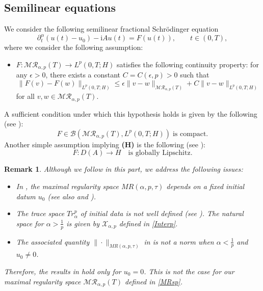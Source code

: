 \documentclass[reqno]{amsart}
\newtheorem{rmk}{Remark}
\numberwithin{equation}{section}
\begin{document}
\subsection{Semilinear equations}
We consider the following semilinear fractional Schr\"odinger equation
\begin{equation}\label{semieq0}
\partial_t^\alpha (u(t)-u_0) -\mathrm{i} Au(t)=F(u(t)), \qquad t \in (0,T),
\end{equation}
where we consider the following assumption:
\begin{itemize}
     \item[\textbf{(H)}] $F: \mathcal{M}\mathcal{R}_{\alpha,p}(T) \to L^p(0,T;H)$ satisfies the following continuity property: for any $\epsilon>0$, there
exists a constant $C=C(\epsilon,p)>0$ such that
     \begin{equation}
        \|F(v)-F(w)\|_{L^p(0,T;H)}\le \epsilon\|v-w\|_{\mathcal{M}\mathcal{R}_{\alpha,p}(T)}+C\|v-w\|_{L^p(0,T;H)}
    \end{equation}
    for all $v,w\in \mathcal{M}\mathcal{R}_{\alpha,p}(T).$
\end{itemize}
A sufficient condition under which this hypothesis holds is given by the following (see \cite[Lemme 8.2]{Are15}):
    \begin{equation}
        F\in \mathcal{B}(\mathcal{M}\mathcal{R}_{\alpha,p}(T), L^p(0,T;H))\; \mbox{is compact}.
    \end{equation}
    Another simple assumption implying \textbf{(H)} is the following (see \cite[Example 4.1]{Ach22}):
   $$F : D(A) \to H \quad \text{is globally Lipschitz}.$$
\begin{rmk}
Although we follow \cite{Ach22} in this part, we address the following issues:
\begin{itemize}
    \item In \cite[p.~14]{Ach22}, the maximal regularity space $MR(\alpha,p,\tau)$ depends on a fixed initial datum $u_0$ (see also \cite[p.~8]{Za09} and \cite[p.~528]{Ach24}).
    \item The trace space $Tr^p_\alpha$ of initial data is not well defined (see \cite[p.~14]{Ach22}). The natural space for $\alpha>\frac{1}{p}$ is given by $\mathcal{X}_{\alpha,p}$ defined in \eqref{Interp}.
    \item The associated quantity $\|\cdot\|_{MR(\alpha,p,\tau)}$ in \cite[p.~14]{Ach22} is not a norm when $\alpha<\frac{1}{p}$ and $u_0\neq 0$.
\end{itemize}
Therefore, the results in \cite{Ach22} hold only for $u_0=0$. This is not the case for our maximal regularity space $\mathcal{MR}_{\alpha,p}(T)$ defined in \eqref{MRsp}.
\end{rmk}
\end{document}
